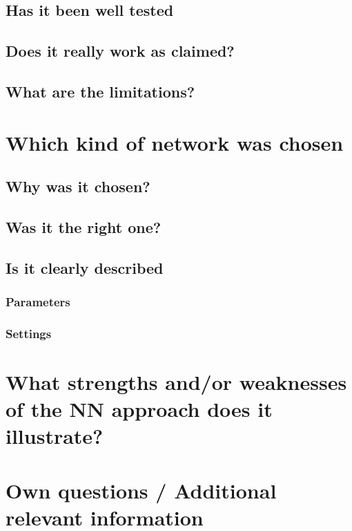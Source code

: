 \documentclass[11pt]{article}
\begin{document}
\subsection{Has it been well tested}
\label{sec:org3c6a330}
\subsection{Does it really work as claimed?}
\label{sec:orgb93e61f}
\subsection{What are the limitations?}
\label{sec:org421492a}

\section{Which kind of network was chosen}
\label{sec:org2f157b4}
\subsection{Why was it chosen?}
\label{sec:org1bac0c7}
\subsection{Was it the right one?}
\label{sec:orge67493b}
\subsection{Is it clearly described}
\label{sec:orga4c10ef}
\subsubsection{Parameters}
\label{sec:org654861d}
\subsubsection{Settings}
\label{sec:org73432fe}

\section{What strengths and/or weaknesses of the NN approach does it illustrate?}
\label{sec:orga2032cc}

\section{Own questions / Additional relevant information}
\label{sec:orgf70f62b}
\end{document}

